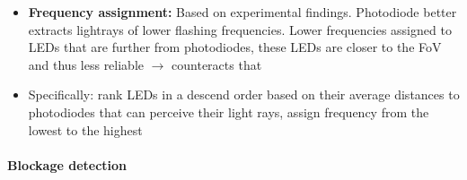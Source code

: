 \documentclass[12pt]{article}
\begin{document}
\begin{itemize}
    \item \textbf{Frequency assignment:} Based on experimental findings. Photodiode better extracts lightrays of lower flashing frequencies. Lower frequencies assigned to LEDs that are further from photodiodes, these LEDs are closer to the FoV and thus less reliable $\rightarrow$ counteracts that
    
    \item Specifically: rank LEDs in a descend order based on their average distances to photodiodes that can perceive their light rays, assign frequency from the lowest to the highest
\end{itemize}

\paragraph{Blockage detection}
\end{document}
